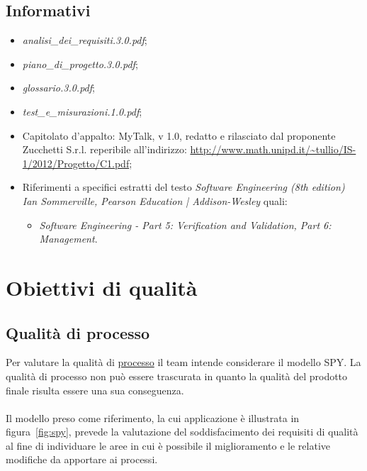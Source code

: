 \subsection{Informativi}

\begin{itemize}
\item[] \textit{analisi\_dei\_requisiti.3.0.pdf};
\item[] \textit{piano\_di\_progetto.3.0.pdf};
\item[] \textit{glossario.3.0.pdf};
\item[] \textit{test\_e\_misurazioni.1.0.pdf};
\item[] Capitolato d'appalto: MyTalk, v 1.0, redatto e rilasciato dal proponente Zucchetti S.r.l. reperibile all'indirizzo: \url{http://www.math.unipd.it/~tullio/IS-1/2012/Progetto/C1.pdf};

\item[] Riferimenti a specifici estratti del testo \textit{Software Engineering (8th edition) Ian Sommerville, Pearson Education | Addison-Wesley} quali:
\begin{itemize}
  \item[] \textit{Software Engineering - Part 5: Verification and Validation, Part 6: Management}.\\
\end{itemize}
\end{itemize}
\clearpage

\section{Obiettivi di qualità}

\subsection{Qualità di processo}
Per valutare la qualità di \underline{processo} il team intende considerare il modello SPY. La qualità di processo non può essere trascurata in quanto la qualità del prodotto finale risulta essere una sua conseguenza.\\\\
Il modello preso come riferimento, la cui applicazione è illustrata in figura~\ref{fig:spy}, prevede la valutazione del soddisfacimento dei requisiti di qualità al fine di individuare le aree in cui è possibile il miglioramento e le relative modifiche da apportare ai processi.
 
